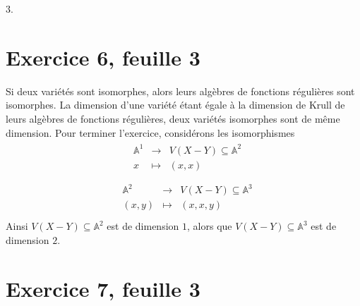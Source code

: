 \documentclass[11pt]{article}
\begin{document}
\begin{question}{3.}
\end{question}

\section*{Exercice 6, feuille 3}
    Si deux variétés sont isomorphes, alors leurs algèbres de fonctions régulières sont isomorphes. La dimension d'une variété étant égale à la dimension de Krull de leurs algèbres de fonctions régulières, deux variétés isomorphes sont de même dimension. Pour terminer l'exercice, considérons les isomorphismes
    \begin{align*}
        \begin{array}{cccc}
            & \mathbb{A}^1 & \to & V(X - Y) \subseteq \mathbb{A}^2 \\
            & x & \mapsto & (x, x) \\
        \end{array}
    \end{align*}
    \begin{align*}
        \begin{array}{cccc}
            & \mathbb{A}^2 & \to & V(X - Y) \subseteq \mathbb{A}^3 \\
            & (x,y) & \mapsto & (x, x, y) \\
        \end{array}
    \end{align*}
    Ainsi $V(X - Y) \subseteq \mathbb{A}^2$ est de dimension $1$, alors que $V(X - Y) \subseteq \mathbb{A}^3$ est de dimension $2$.

\section*{Exercice 7, feuille 3}
\end{document}
